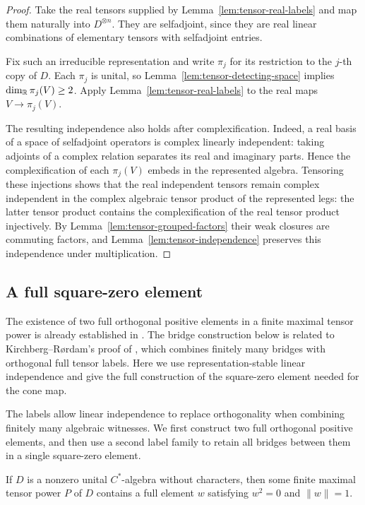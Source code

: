 \begin{proof}
Take the real tensors supplied by Lemma~\ref{lem:tensor-real-labels}
and map them naturally into \(D^{\otimes n}\). They are selfadjoint,
since they are real linear combinations of elementary tensors with
selfadjoint entries.

Fix such an irreducible representation and write \(\pi_j\) for its
restriction to the \(j\)-th copy of \(D\). Each \(\pi_j\) is unital, so
Lemma~\ref{lem:tensor-detecting-space} implies
\(\dim_{\mathbb R}\pi_j(V)\ge2\). Apply
Lemma~\ref{lem:tensor-real-labels} to the real maps
\(V\to\pi_j(V)\).

The resulting independence also holds after complexification.
Indeed, a real basis of a space of selfadjoint operators is complex
linearly independent: taking adjoints of a complex relation separates
its real and imaginary parts. Hence the complexification of each
\(\pi_j(V)\) embeds in the represented algebra. Tensoring these
injections shows that the real independent tensors remain complex
independent in the complex algebraic tensor product of the represented
legs: the latter tensor product contains the complexification of the
real tensor product injectively. By
Lemma~\ref{lem:tensor-grouped-factors} their weak closures are
commuting factors, and Lemma~\ref{lem:tensor-independence} preserves this
independence under multiplication.
\end{proof}

\subsection{A full square-zero element}

The existence of two full orthogonal positive elements in a finite
maximal tensor power is already established in
\cite[Theorem~1.4]{Fixed231}. The bridge construction below is related to
Kirchberg--R\o rdam's proof of \cite[Proposition~6.1, (i)$\Rightarrow$(v)]{KR},
which combines finitely many bridges with orthogonal full tensor labels.
Here we use representation-stable linear independence and give the full
construction of the square-zero element needed for the cone map.

The labels allow linear independence to replace orthogonality when
combining finitely many algebraic witnesses. We first construct two full
orthogonal positive elements, and then use a second label family to
retain all bridges between them in a single square-zero element.

\begin{lemma}
\label{lem:tensor-full-square-zero}
If \(D\) is a nonzero unital \(C^*\)-algebra without characters, then
some finite maximal tensor power \(P\) of \(D\) contains a full element
\(w\) satisfying \(w^2=0\) and \(\|w\|=1\).
\end{lemma}

